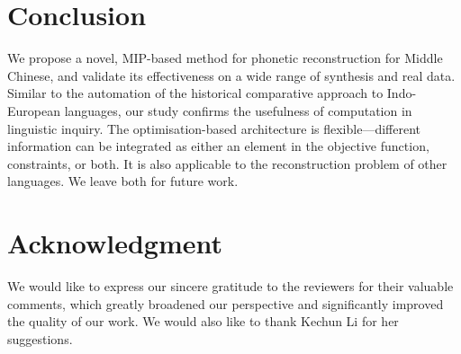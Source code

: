 \section{Conclusion} \label{conclusion}

We propose a novel, MIP-based method for phonetic reconstruction for Middle Chinese,
and validate its effectiveness on a wide range of synthesis and real data. 
Similar to the automation of the historical comparative approach to Indo-European languages, our study confirms the usefulness of computation in linguistic inquiry.  
The optimisation-based architecture is flexible---different information can be integrated as either an element in the objective function,  constraints, or both.
It is also applicable to the reconstruction problem of other languages.
We leave both for future work.



\section*{Acknowledgment}
We would like to express our sincere gratitude to the reviewers for their valuable comments, which greatly broadened our perspective and significantly improved the quality of our work. We would also like to thank Kechun Li for her suggestions. 

